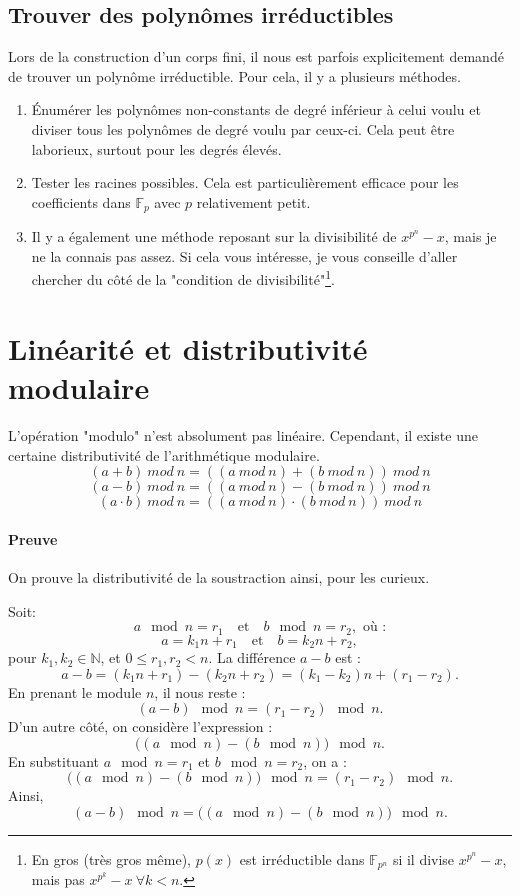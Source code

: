 \documentclass[10pt,a4paper]{book}
\newcommand{\N}{\mathbb{N}}
\newcommand{\F}{\mathbb{F}}
\begin{document}
\subsection{Trouver des polynômes irréductibles}
Lors de la construction d'un corps fini, il nous est parfois explicitement demandé de trouver un polynôme irréductible. Pour cela, il y a plusieurs méthodes. 
\begin{enumerate}
\item Énumérer les polynômes non-constants de degré inférieur à celui voulu et diviser tous les polynômes de degré voulu par ceux-ci. Cela peut être laborieux, surtout pour les degrés élevés.
\item Tester les racines possibles. Cela est particulièrement efficace pour les coefficients dans $\F_p$ avec $p$ relativement petit. 
\item Il y a également une méthode reposant sur la divisibilité de $x^{p^n}-x$, mais je ne la connais pas assez. Si cela vous intéresse, je vous conseille d'aller chercher du côté de la "condition de divisibilité"\footnote{En gros (très gros même), $p(x)$ est irréductible dans $\F_{p^n}$ si il divise $x^{p^n}-x$, mais pas $x^{p^k}-x\ \forall k<n$.}.
\end{enumerate}

\section{Linéarité et distributivité modulaire}
L'opération "modulo" n'est absolument pas linéaire. Cependant, il existe une certaine distributivité de l'arithmétique modulaire.
\[(a+b)\ mod\ n = ((a\ mod\ n)+(b\ mod\ n))\ mod\ n\]
\[(a-b)\ mod\ n = ((a\ mod\ n)-(b\ mod\ n))\ mod\ n\]
\[(a\cdot b)\ mod\ n = ((a\ mod\ n)\cdot(b\ mod\ n))\ mod\ n\]
\paragraph{Preuve}
On prouve la distributivité de la soustraction ainsi, pour les curieux.\par 
Soit:
\[a \mod n = r_1 \quad \text{et} \quad b \mod n = r_2,\text{ où :}\]
\[a = k_1 n + r_1 \quad \text{et} \quad b = k_2 n + r_2,\]
pour \(k_1,k_2\in\N\), et \(0 \leq r_1, r_2 < n\).
La différence \(a - b\) est :
\[a - b = (k_1 n + r_1) - (k_2 n + r_2) = (k_1 - k_2)n + (r_1 - r_2).\]
En prenant le module \(n\), il nous reste :
\[(a - b) \mod n = (r_1 - r_2) \mod n.\]
D'un autre côté, on considère l'expression :
\[\big((a \mod n) - (b \mod n)\big) \mod n.\]
En substituant \(a \mod n = r_1\) et \(b \mod n = r_2\), on a :
\[\big((a \mod n) - (b \mod n)\big) \mod n = (r_1 - r_2) \mod n.\]
Ainsi,
\[(a - b) \mod n = \big((a \mod n) - (b \mod n)\big) \mod n.\]
\end{document}
